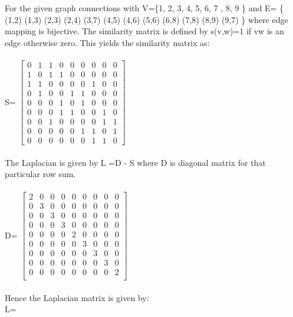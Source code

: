 For the given graph connections with V=\{1, 2, 3, 4, 5, 6, 7 , 8, 9 \} and E= \{ (1,2) (1,3) (2,3) (2,4) (3,7) (4,5) (4,6) (5,6) (6,8) (7,8) (8,9) (9,7) \} where edge mapping is bijective.
The similarity matrix is defined by s(v,w)=1 if vw is an edge otherwise zero. This yields the similarity matrix as: \\ \\ 
S=
$\begin{bmatrix}
0 &1& 1& 0 & 0 & 0 & 0 & 0 & 0 \\
1 &0& 1& 1& 0& 0& 0& 0& 0 \\
1 &1& 0& 0& 0& 0& 1& 0& 0 \\
0 &1& 0& 0& 1& 1& 0& 0& 0 \\
0 &0 &0 &1 &0 &1 &0 &0 &0 \\
0 &0 &0 &1 &1 &0 &0 &1 &0 \\
0 &0 &1 &0 &0 &0 &0 &1 &1 \\
0 &0 &0 &0 &0 &1 &1 &0 &1 \\
0 &0 &0 &0 &0 &0 &1 &1 &0
\end{bmatrix}
$
\\ \\ The Laplacian is given by L =D - S where D is diagonal matrix for that particular row sum.\\ \\
D=
$
\begin{bmatrix}
2  &   0  &   0 &    0  &   0  &   0  &   0  &   0  &   0 \\
0  &  3  &   0   &  0   &  0   &  0   &  0   &  0  &   0 \\
0  &   0 &    3  &   0  &   0  &   0 &    0  &   0 &    0 \\
0   &  0   &  0   &  3  &   0  &   0   &  0   &  0   &  0 \\
0   &  0  &   0  &   0  &   2  &   0   &  0  &   0  &   0 \\
0   &  0   &  0   &  0  &   0   &  3   &  0   &  0  &   0 \\
0   &  0   &  0   &  0  &   0  &   0   &  3   &  0  &   0 \\
0   &  0  &   0  &   0  &   0   &  0  &   0   &  3   &  0 \\
0   &  0  &   0   &  0  &   0  &   0  &   0   &  0   &  2 \\

\end{bmatrix}
$
\\ \\
Hence the Laplacian matrix is given by:\\
L=
